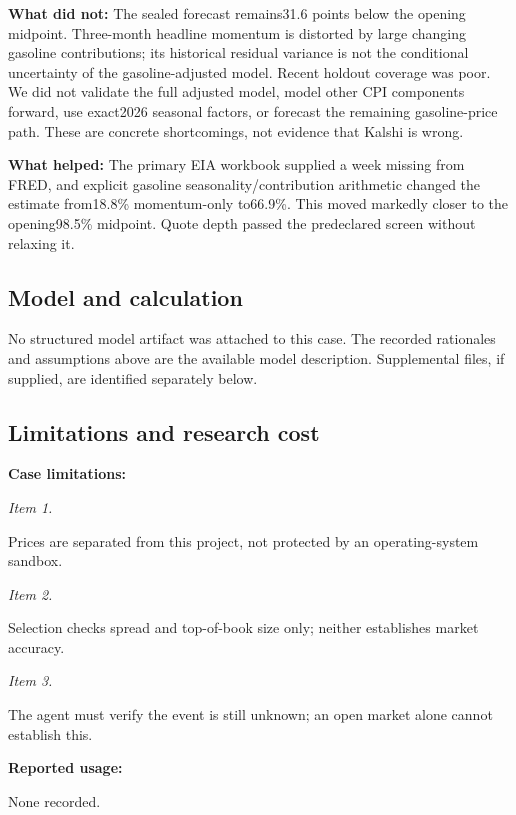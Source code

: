 \documentclass[11pt]{article}
\begin{document}
\par\noindent\textbf{What did not:} The sealed forecast remains31.6 points below the opening midpoint. Three-month headline momentum is distorted by large changing gasoline contributions; its historical residual variance is not the conditional uncertainty of the gasoline-adjusted model. Recent holdout coverage was poor. We did not validate the full adjusted model, model other CPI components forward, use exact2026 seasonal factors, or forecast the remaining gasoline-price path. These are concrete shortcomings, not evidence that Kalshi is wrong.

\par\noindent\textbf{What helped:} The primary EIA workbook supplied a week missing from FRED, and explicit gasoline seasonality/contribution arithmetic changed the estimate from18.8\% momentum-only to66.9\%. This moved markedly closer to the opening98.5\% midpoint. Quote depth passed the predeclared screen without relaxing it.

\subsection*{\textcolor{epdarkgreen}{Model and calculation}}
No structured model artifact was attached to this case. The recorded rationales and assumptions above are the available model description. Supplemental files, if supplied, are identified separately below.


\subsection*{\textcolor{epdarkgreen}{Limitations and research cost}}
\par\noindent\textbf{Case limitations:} \par \par\noindent\textit{Item 1.}\par Prices are separated from this project, not protected by an operating-system sandbox.

\par\noindent\textit{Item 2.}\par Selection checks spread and top-of-book size only; neither establishes market accuracy.

\par\noindent\textit{Item 3.}\par The agent must verify the event is still unknown; an open market alone cannot establish this.

\par\noindent\textbf{Reported usage:} \par None recorded.
\end{document}
